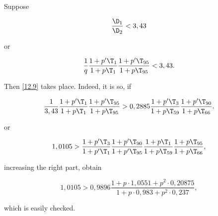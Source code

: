 Suppose

\begin{equation}\label{goodness_condition_3,43} %
	\dfrac{\D_1}{\D_2} < 3,43
\end{equation}

or

\begin{equation*}
	\dfrac{1}{q}
	\dfrac{1 + p' \T_{1}}{1 + p \T_{1}}
	\dfrac{1 + p' \T_{95}}{1 + p \T_{95}}
	<
	3,43.
\end{equation*}

Then \ref{12.9} takes place. Indeed, it is so, if

\begin{equation*}
	\dfrac{1}{3,43}
	\dfrac{1 + p' \T_{1}}{1 + p \T_{1}}
	\dfrac{1 + p' \T_{95}}{1 + p \T_{95}}
	>
	0,2885
	\dfrac{1 + p' \T_{3}}{1 + p \T_{59}}
	\dfrac{1 + p' \T_{90}}{1 + p \T_{66}}.
\end{equation*}

or

\begin{equation*}
	1,0105
	>
	\dfrac{1 + p' \T_{3}}{1 + p' \T_{1}}
	\dfrac{1 + p' \T_{90}}{1 + p' \T_{95}}
	\dfrac{1 + p \T_{1}}{1 + p \T_{59}}
	\dfrac{1 + p \T_{95}}{1 + p \T_{66}},
\end{equation*}

increasing the right part, obtain

\begin{equation*}
	1,0105
	>
	0,9896
	\dfrac
	{1 + p \cdot 1,0551 + p^2 \cdot 0,20875}
	{1 + p \cdot 0,983 + p^2 \cdot 0,237},
\end{equation*}

which is easily checked.
